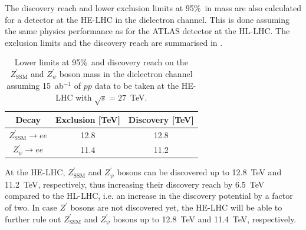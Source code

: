 The discovery reach and lower exclusion limits at 95\%~\cl in mass are also calculated for a detector at the HE-LHC in the dielectron channel. This is done assuming the same physics performance as for the ATLAS detector at the HL-LHC.
The exclusion limits and the discovery reach are summarised in .

\begin{table}[!tbp]
  \caption{Lower limits at 95\%~\cl and discovery reach on the $Z^\prime_\mathrm{SSM}$ and $Z^\prime_\psi$ boson mass in the dielectron channel assuming 15~ab$^{-1}$ of $pp$ data to be taken at the HE-LHC with $\sqrt{s}=27$~TeV. }
  \centering
  \begin{tabular}{c|cc}
    \hline
    \hline
    Decay     &  Exclusion [TeV]& Discovery [TeV]\\
    \hline
    $Z^\prime_\mathrm{SSM} \to ee$ & 12.8 & 12.8\\
    $Z^\prime_\psi \to ee$ & 11.4 & 11.2\\ 
    \hline
    \hline
  \end{tabular}
  \label{tab:ATLAS_zplllimits_27}
\end{table}
At the HE-LHC, $Z^\prime_\mathrm{SSM}$ and $Z^\prime_\psi$ bosons can be discovered up to 12.8~TeV and 11.2~TeV, respectively,
thus increasing their discovery reach by 6.5~TeV compared to the HL-LHC, i.e. an increase in the
discovery potential by a factor of two.
In case $Z^\prime$ bosons are not discovered yet, the HE-LHC will be able to further rule out
$Z^\prime_\mathrm{SSM}$ and $Z^\prime_\psi$ bosons up to 12.8~TeV and 11.4~TeV, respectively.

